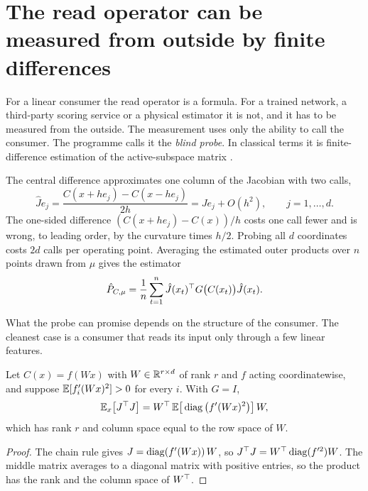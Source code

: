 \section{The read operator can be measured from outside by finite differences}\label{sec:ch06:probe}

For a linear consumer the read operator is a formula. For a trained network, a third-party scoring service or a physical estimator it is not, and it has to be measured from the outside. The measurement uses only the ability to call the consumer. The programme calls it the \emph{blind probe}. In classical terms it is finite-difference estimation of the active-subspace matrix \cite{constantine2015}.

The central difference approximates one column of the Jacobian with two calls,
\begin{equation}\label{eq:ch06:central}
\hat J e_j=\frac{C(x+h e_j)-C(x-h e_j)}{2h}=J e_j+O(h^2),\qquad j=1,\dots,d .
\end{equation}
The one-sided difference $(C(x+he_j)-C(x))/h$ costs one call fewer and is wrong, to leading order, by the curvature times $h/2$. Probing all $d$ coordinates costs $2d$ calls per operating point. Averaging the estimated outer products over $n$ points drawn from $\mu$ gives the estimator
\begin{equation}\label{eq:ch06:probe}
\hat P_{C,\mu}=\frac1n\sum_{t=1}^n \hat J(x_t)^{\top} G\big(C(x_t)\big)\hat J(x_t).
\end{equation}

What the probe can promise depends on the structure of the consumer. The cleanest case is a consumer that reads its input only through a few linear features.

\begin{proposition}\label{prop:ch06:recovery}
Let $C(x)=f(Wx)$ with $W\in\mathbb{R}^{r\times d}$ of rank $r$ and $f$ acting coordinatewise, and suppose $\mathbb{E}[f_i'(Wx)^2]>0$ for every $i$. With $G=I$,
\begin{equation}\label{eq:ch06:recovery}
\mathbb{E}_x\big[J^{\top} J\big]=W^{\top}\,\mathbb{E}\big[\operatorname{diag}\big(f'(Wx)^2\big)\big]\,W,
\end{equation}
which has rank $r$ and column space equal to the row space of $W$.
\end{proposition}

\begin{proof}
The chain rule gives $J=\operatorname{diag}(f'(Wx))\,W$, so $J^{\top} J=W^{\top}\operatorname{diag}(f'^2)W$. The middle matrix averages to a diagonal matrix with positive entries, so the product has the rank and the column space of $W^{\top}$.
\end{proof}

